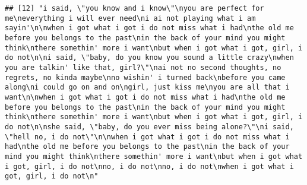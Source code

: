 \documentclass[]{article}
\begin{document}
\begin{verbatim}
## [12] "i said, \"you know and i know\"\nyou are perfect for me\neverything i will ever need\ni ai not playing what i am sayin'\n\nwhen i got what i got i do not miss what i had\nthe old me before you belongs to the past\nin the back of your mind you might think\nthere somethin' more i want\nbut when i got what i got, girl, i do not\n\ni said, \"baby, do you know you sound a little crazy\nwhen you are talkin' like that, girl?\"\nai not no second thoughts, no regrets, no kinda maybe\nno wishin' i turned back\nbefore you came along\ni could go on and on\ngirl, just kiss me\nyou are all that i want\n\nwhen i got what i got i do not miss what i had\nthe old me before you belongs to the past\nin the back of your mind you might think\nthere somethin' more i want\nbut when i got what i got, girl, i do not\n\nshe said, \"baby, do you ever miss being alone?\"\ni said, \"hell no, i do not\"\n\nwhen i got what i got i do not miss what i had\nthe old me before you belongs to the past\nin the back of your mind you might think\nthere somethin' more i want\nbut when i got what i got, girl, i do not\nno, i do not\nno, i do not\nwhen i got what i got, girl, i do not\n"                                                                                                                                                                                                                                                                                                                                                                                                                                                                                                                                                                                                                                                                                                                                                                                                                                                                                                                                                                                                                                                                                                                                                                                                                                                                                                                                                                                                                                                                                                                                                                                                                                                                                                                                                                        

\end{verbatim}
\end{document}
